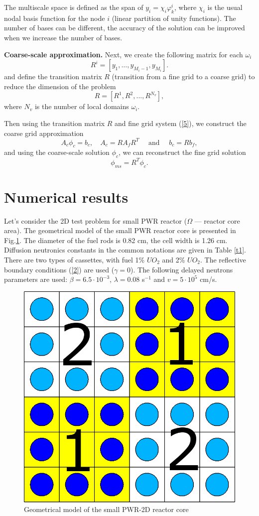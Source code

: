 \documentclass[authoryear]{elsarticle}
\begin{document}
The multiscale space is defined as the span of $y_i = \chi_i \varphi^i_k$, where $\chi_i$ is the usual nodal basis function for the node $i$ (linear partition of unity functions). 
The number of bases can be different, the accuracy of the solution can be improved when we increase the number of bases.

\textbf{Coarse-scale approximation. }
Next, we create the following  matrix for each $\omega_i$
\[
R^i = \left[ y_1, \ldots, y_{M_i-1},  y_{M_i} \right].
\]
and define the transition matrix $R$ (transition from a fine grid to a coarse grid) to reduce the dimension of the problem
\[
R = [ R^1, R^2, ..., R^{N_v} ],
\]
where $N_v$ is the number of local domains $\omega_i$.

Then using the transition matrix $R$ and fine grid system (\ref{5}), we construct the coarse grid approximation
\begin{equation}\label{10}
A_c \phi_c = b_c, \quad 
A_c = R A_f R^T 
\quad \text{ and } \quad 
b_c = R b_f,
\end{equation}  
and using the coarse-scale solution $\phi_c$, we can  reconstruct the fine grid solution 
\[
\phi_{ms} = R^T \phi_c.
\]

\section{Numerical results}
Let's consider the 2D test problem for small PWR reactor ($\Omega$ --- reactor core area). 
The geometrical model of the small PWR reactor core is presented in Fig.\ref{p3}. 
The diameter of the fuel rods is 0.82 cm, the cell width is 1.26 cm.
Diffusion neutronics constants in the common notations are given in Table \ref{t1}. 
There are two types of cassettes, with fuel 1\% $UO_2$ and 2\% $UO_2$.
The reflective boundary conditions (\ref{2}) are used ($\gamma = 0$).
The following delayed neutrons parameters are used: $\beta = 6.5 \cdot 10^{-3}$, $\lambda = 0.08$ s$^{-1}$ and $v = 5 \cdot 10^5$ cm/s.

\begin{figure}[h]
	\centering
	    \includegraphics[width=0.5\linewidth] {smallpwr.png}
	\caption{Geometrical model of the small PWR-2D reactor core}
	\label{p3}
\end{figure} 
\end{document}
